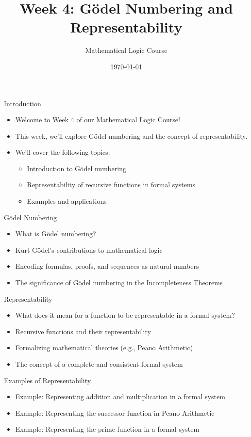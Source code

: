 \documentclass[presentation]{beamer}
\author{Mathematical Logic Course}
\date{\today}
\title{Week 4: Gödel Numbering and Representability}
\begin{document}
\maketitle

\begin{frame}[label={sec:orgcaf1d4f}]{Introduction}
\begin{itemize}
\item Welcome to Week 4 of our Mathematical Logic Course!
\item This week, we'll explore Gödel numbering and the concept of representability.
\item We'll cover the following topics:
\begin{itemize}
\item Introduction to Gödel numbering
\item Representability of recursive functions in formal systems
\item Examples and applications
\end{itemize}
\end{itemize}
\end{frame}

\begin{frame}[label={sec:orge4d01c5}]{Gödel Numbering}
\begin{itemize}
\item What is Gödel numbering?
\item Kurt Gödel's contributions to mathematical logic
\item Encoding formulas, proofs, and sequences as natural numbers
\item The significance of Gödel numbering in the Incompleteness Theorems
\end{itemize}
\end{frame}

\begin{frame}[label={sec:org9ef848a}]{Representability}
\begin{itemize}
\item What does it mean for a function to be representable in a formal system?
\item Recursive functions and their representability
\item Formalizing mathematical theories (e.g., Peano Arithmetic)
\item The concept of a complete and consistent formal system
\end{itemize}
\end{frame}

\begin{frame}[label={sec:orgba64cd7}]{Examples of Representability}
\begin{itemize}
\item Example: Representing addition and multiplication in a formal system
\item Example: Representing the successor function in Peano Arithmetic
\item Example: Representing the prime function in a formal system
\end{itemize}
\end{frame}
\end{document}
